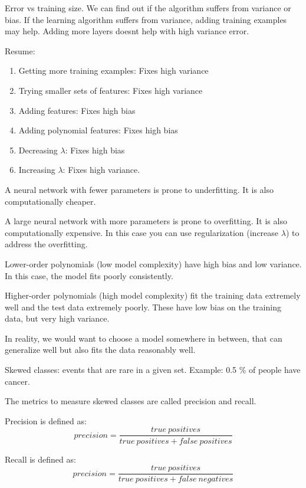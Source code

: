\documentclass[12pt,a4paper]{report}
\begin{document}
	Error vs training size. We can find out if the algorithm suffers from variance or bias. If the learning algorithm suffers from variance, adding training examples may help. Adding more layers doesnt help with high variance error.
	
	Resume:
	
	\begin{enumerate}
	\item Getting more training examples: Fixes high variance
\item Trying smaller sets of features: Fixes high variance
\item Adding features: Fixes high bias
\item Adding polynomial features: Fixes high bias
\item Decreasing $\lambda$: Fixes high bias
\item Increasing $\lambda$: Fixes high variance.
	\end{enumerate}
	
	A neural network with fewer parameters is prone to underfitting. It is also computationally cheaper.
	
A large neural network with more parameters is prone to overfitting. It is also computationally expensive. In this case you can use regularization (increase $\lambda$) to address the overfitting.

Lower-order polynomials (low model complexity) have high bias and low variance. In this case, the model fits poorly consistently.

Higher-order polynomials (high model complexity) fit the training data extremely well and the test data extremely poorly. These have low bias on the training data, but very high variance.

In reality, we would want to choose a model somewhere in between, that can generalize well but also fits the data reasonably well.
	
	Skewed classes: events that are rare in a given set. Example: 0.5 \% of people have cancer.
	
	The metrics to measure skewed classes are called precision and recall.
	
	Precision is defined as: 
	\begin{equation}
	precision = \frac{true \ positives}{true \ positives + false \ positives}
	\end{equation}
	
	Recall is defined as:
	\begin{equation}
	precision = \frac{true \ positives}{true \ positives + false \ negatives}
	\end{equation}	
	
\end{document}
